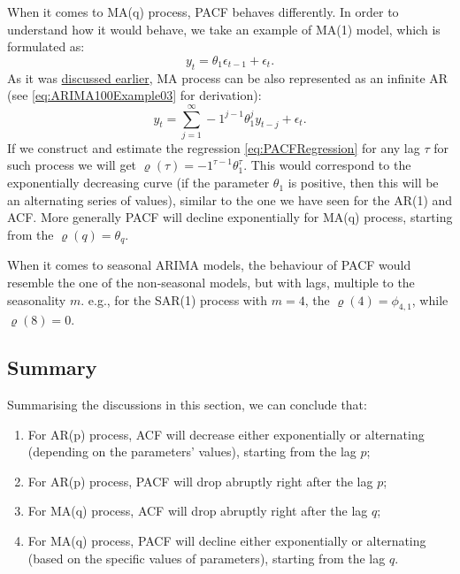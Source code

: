 \documentclass[
]{book}
\providecommand{\tightlist}{%
  \setlength{\itemsep}{0pt}\setlength{\parskip}{0pt}}
\theoremstyle{definition}
\theoremstyle{definition}
\theoremstyle{definition}
\theoremstyle{definition}
\theoremstyle{remark}
\begin{document}
When it comes to MA(q) process, PACF behaves differently. In order to understand how it would behave, we take an example of MA(1) model, which is formulated as:
\begin{equation*}
  y_t = \theta_1 \epsilon_{t-1} + \epsilon_t.
\end{equation*}
As it was \protect\hyperlink{ARIMABounds}{discussed earlier}, MA process can be also represented as an infinite AR (see \eqref{eq:ARIMA100Example03} for derivation):
\begin{equation*}
  y_t = \sum_{j=1}^\infty -1^{j-1} \theta_1^j y_{t-j} + \epsilon_t.
\end{equation*}
If we construct and estimate the regression \eqref{eq:PACFRegression} for any lag \(\tau\) for such process we will get \(\varrho(\tau)=-1^{\tau-1} \theta_1^\tau\). This would correspond to the exponentially decreasing curve (if the parameter \(\theta_1\) is positive, then this will be an alternating series of values), similar to the one we have seen for the AR(1) and ACF. More generally PACF will decline exponentially for MA(q) process, starting from the \(\varrho(q)=\theta_q\).

When it comes to seasonal ARIMA models, the behaviour of PACF would resemble the one of the non-seasonal models, but with lags, multiple to the seasonality \(m\). e.g., for the SAR(1) process with \(m=4\), the \(\varrho(4)=\phi_{4,1}\), while \(\varrho(8)=0\).

\hypertarget{BJApproachSummary}{%
\subsection{Summary}\label{BJApproachSummary}}

Summarising the discussions in this section, we can conclude that:

\begin{enumerate}
\def\labelenumi{\arabic{enumi}.}
\tightlist
\item
  For AR(p) process, ACF will decrease either exponentially or alternating (depending on the parameters' values), starting from the lag \(p\);
\item
  For AR(p) process, PACF will drop abruptly right after the lag \(p\);
\item
  For MA(q) process, ACF will drop abruptly right after the lag \(q\);
\item
  For MA(q) process, PACF will decline either exponentially or alternating (based on the specific values of parameters), starting from the lag \(q\).
\end{enumerate}
\end{document}
